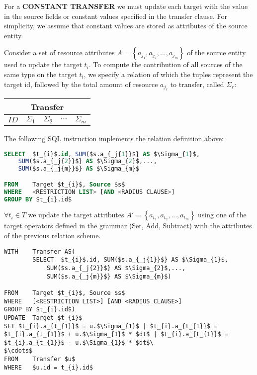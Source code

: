 For a \textbf{CONSTANT TRANSFER} we must update each target with the value in the source fields or
constant values specified in the transfer clause. For simplicity, we
assume that constant values are stored as attributes of the
source entity.

Consider a set of resource attributes
$A = \left\lbrace  a_{j_{1}},a_{j_{2}},...,a_{j_{m}} \right\rbrace $
of the source entity used to update the target $t_{i}$. To
compute the contribution of all sources of the same type on the target
$t_{i}$, we specify a relation of which the tuples represent the
target id, followed by the total amount of resource $a_{j_{r}}$ to
transfer, called $\Sigma_{r}$:

\begin{center}
\begin{tabular}
{| c | c | c | c | c |}
\hline
\multicolumn{5}{|c|}{Transfer} \\
\hline
$ID$ & $\Sigma_{1}$ & $\Sigma_{2}$ & $\cdots$ & $\Sigma_{m}$ \\
\hline
\end{tabular}
\end{center}

The following SQL instruction implements the relation definition above:
\begin{lstlisting}[language=sql]
SELECT	$t_{i}$.id, SUM($s.a_{_j{1}}$} AS $\Sigma_{1}$,
	SUM($s.a_{_j{2}}$} AS $\Sigma_{2}$,...,
	SUM($s.a_{_j{m}}$} AS $\Sigma_{m}$

FROM	Target $t_{i}$, Source $s$
WHERE	<RESTRICTION LIST> [AND <RADIUS CLAUSE>]
GROUP BY $t_{i}.id$
\end{lstlisting}

$\forall t_{i} \in T$ we update the target attributes $A' =
\left\lbrace a_{t_{1}},a_{t_{2}},...,a_{t_{m}} \right\rbrace$ using
one of the target operators defined in the grammar (Set, Add,
Subtract) with the attributes of the previous relation scheme.
\begin{lstlisting}
WITH	Transfer AS(
		SELECT	$t_{i}$.id, SUM($s.a_{_j{1}}$} AS $\Sigma_{1}$,
			SUM($s.a_{_j{2}}$} AS $\Sigma_{2}$,...,
			SUM($s.a_{_j{m}}$} AS $\Sigma_{m}$)

FROM	Target $t_{i}$, Source $s$
WHERE	[<RESTRICTION LIST>] [AND <RADIUS CLAUSE>]
GROUP BY $t_{i}.id$)
UPDATE	Target $t_{i}$
SET	$t_{i}.a_{t_{1}}$ = u.$\Sigma_{1}$ | $t_{i}.a_{t_{1}}$ = $t_{i}.a_{t_{1}}$ + u.$\Sigma_{1}$ * $dt$ | $t_{i}.a_{t_{1}}$ =
$t_{i}.a_{t_{1}}$ - u.$\Sigma_{1}$ * $dt$\
$\cdots$
FROM	Transfer $u$
WHERE	$u.id = t_{i}.id$
\end{lstlisting}

